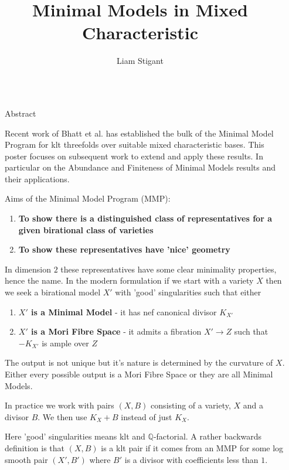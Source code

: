 \documentclass[final]{beamer}
\title{Minimal Models in Mixed Characteristic}
\author{Liam Stigant}
\institute[shortinst]{Imperial College London}
\newlength{\sepwidth}
\newcommand{\separatorcolumn}{\begin{column}{\sepwidth}\end{column}}
\begin{document}
	
	\begin{frame}[t, fragile]
	\begin{columns}[t]
		\separatorcolumn
		
		\begin{column}{0.15\paperwidth}
			
			\begin{block}{Abstract}
				
				Recent work of Bhatt et al. has established the bulk of the Minimal Model Program for klt threefolds over suitable mixed characteristic bases. This poster focuses on subsequent work to extend and apply these results. In particular on the Abundance and Finiteness of Minimal Models results and their applications.
				
			\end{block}
			
			\begin{block}{Aims of the Minimal Model Program (MMP):}
				\begin{enumerate}
					\item \textbf{To show there is a distinguished class of representatives for a given birational class of varieties}
					\item \textbf{To show these representatives have 'nice' geometry}
				\end{enumerate}
				
				In dimension $2$ these representatives have some clear minimality properties, hence the name. In the modern formulation if we start with a variety $X$ then we seek a birational model $X'$ with 'good' singularities such that either  
				\begin{enumerate}
					\item \textbf{$X'$ is a Minimal Model} - it has nef canonical divisor $K_{X'}$
					\item \textbf{$X'$ is a Mori Fibre Space} - it admits a fibration $X' \to  Z$ such that $-K_{X'}$ is ample over $Z$ 
				\end{enumerate}
				
				The output is not unique but it's nature is determined by the curvature of $X$. Either every possible output is a Mori Fibre Space or they are all Minimal Models.
				
				In practice we work with pairs $(X,B)$ consisting of a variety, $X$ and a divisor $B$. We then use $K_{X}+B$ instead of just $K_{X}$.
				
				Here 'good' singularities means klt and $\mathbb{Q}$-factorial. A rather backwards definition is that $(X,B)$ is a klt pair if it comes from an MMP for some log smooth pair $(X',B')$ where $B'$ is a divisor with coefficients less than $1$.
			\end{block}
			

\end{column}
\end{columns}
\end{frame}
\end{document}
